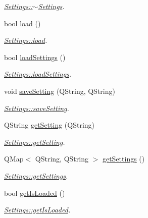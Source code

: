 \begin{DoxyCompactItemize}
\begin{DoxyCompactList}\small\item\em \hyperlink{class_settings_a4a65be5921dfc9fddc476e5320541d89}{Settings\+::$\sim$\+Settings}. \end{DoxyCompactList}\item 
bool \hyperlink{class_settings_a06d1d58938c8fdc7a577e52f9ffda29d}{load} ()
\begin{DoxyCompactList}\small\item\em \hyperlink{class_settings_a06d1d58938c8fdc7a577e52f9ffda29d}{Settings\+::load}. \end{DoxyCompactList}\item 
bool \hyperlink{class_settings_a2d965ef0a054b61050811b416c896ed4}{load\+Settings} ()
\begin{DoxyCompactList}\small\item\em \hyperlink{class_settings_a2d965ef0a054b61050811b416c896ed4}{Settings\+::load\+Settings}. \end{DoxyCompactList}\item 
void \hyperlink{class_settings_ac17de21379552ef437d94e01e94a0331}{save\+Setting} (Q\+String, Q\+String)
\begin{DoxyCompactList}\small\item\em \hyperlink{class_settings_ac17de21379552ef437d94e01e94a0331}{Settings\+::save\+Setting}. \end{DoxyCompactList}\item 
Q\+String \hyperlink{class_settings_a9a1d774542aba721bec9cf1ebb086b84}{get\+Setting} (Q\+String)
\begin{DoxyCompactList}\small\item\em \hyperlink{class_settings_a9a1d774542aba721bec9cf1ebb086b84}{Settings\+::get\+Setting}. \end{DoxyCompactList}\item 
Q\+Map$<$ Q\+String, Q\+String $>$ \hyperlink{class_settings_a3b407c7af1bff73221a8fa25be6b3860}{get\+Settings} ()
\begin{DoxyCompactList}\small\item\em \hyperlink{class_settings_a3b407c7af1bff73221a8fa25be6b3860}{Settings\+::get\+Settings}. \end{DoxyCompactList}\item 
bool \hyperlink{class_settings_a8cf925a493600b52b80f75a50b850eac}{get\+Is\+Loaded} ()
\begin{DoxyCompactList}\small\item\em \hyperlink{class_settings_a8cf925a493600b52b80f75a50b850eac}{Settings\+::get\+Is\+Loaded}. \end{DoxyCompactList}\end{DoxyCompactItemize}


